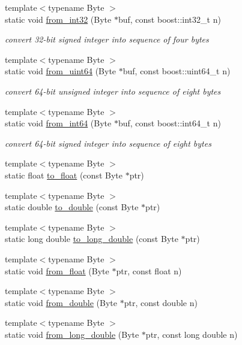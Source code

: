 \begin{DoxyCompactItemize}
{\footnotesize template$<$typename Byte $>$ }\\static void \hyperlink{structpion_1_1algorithm_acea1222844d4cb2fa93cd2510999e376}{from\-\_\-int32} (Byte $\ast$buf, const boost\-::int32\-\_\-t n)
\begin{DoxyCompactList}\small\item\em convert 32-\/bit signed integer into sequence of four bytes \end{DoxyCompactList}\item 
{\footnotesize template$<$typename Byte $>$ }\\static void \hyperlink{structpion_1_1algorithm_a5b030d4284869249e23311d75eaedd57}{from\-\_\-uint64} (Byte $\ast$buf, const boost\-::uint64\-\_\-t n)
\begin{DoxyCompactList}\small\item\em convert 64-\/bit unsigned integer into sequence of eight bytes \end{DoxyCompactList}\item 
{\footnotesize template$<$typename Byte $>$ }\\static void \hyperlink{structpion_1_1algorithm_ad89ffdbdeab62a40643b566a166ec726}{from\-\_\-int64} (Byte $\ast$buf, const boost\-::int64\-\_\-t n)
\begin{DoxyCompactList}\small\item\em convert 64-\/bit signed integer into sequence of eight bytes \end{DoxyCompactList}\item 
{\footnotesize template$<$typename Byte $>$ }\\static float \hyperlink{structpion_1_1algorithm_a31acba5139987280e2d51aeb48f21f28}{to\-\_\-float} (const Byte $\ast$ptr)
\item 
{\footnotesize template$<$typename Byte $>$ }\\static double \hyperlink{structpion_1_1algorithm_a00b83de67d45aceec623296314885f81}{to\-\_\-double} (const Byte $\ast$ptr)
\item 
{\footnotesize template$<$typename Byte $>$ }\\static long double \hyperlink{structpion_1_1algorithm_aad9a66169d2c5a3b009ae25255775cf0}{to\-\_\-long\-\_\-double} (const Byte $\ast$ptr)
\item 
{\footnotesize template$<$typename Byte $>$ }\\static void \hyperlink{structpion_1_1algorithm_a281972f7e3f6a234080e1c792d920723}{from\-\_\-float} (Byte $\ast$ptr, const float n)
\item 
{\footnotesize template$<$typename Byte $>$ }\\static void \hyperlink{structpion_1_1algorithm_a241c29e87904952a01f40624d5494aef}{from\-\_\-double} (Byte $\ast$ptr, const double n)
\item 
{\footnotesize template$<$typename Byte $>$ }\\static void \hyperlink{structpion_1_1algorithm_a387c15c00a1d229059e9da8ff9e0aa84}{from\-\_\-long\-\_\-double} (Byte $\ast$ptr, const long double n)
\end{DoxyCompactItemize}
